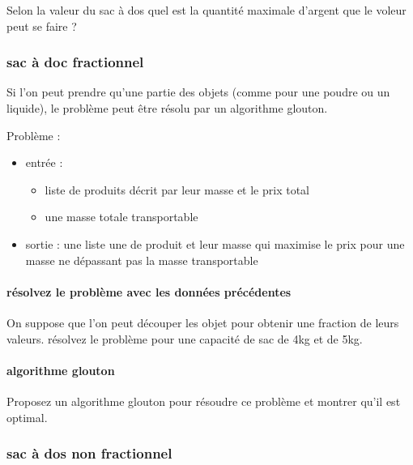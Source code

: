\documentclass[
]{article}
\providecommand{\tightlist}{%
  \setlength{\itemsep}{0pt}\setlength{\parskip}{0pt}}
\begin{document}
Selon la valeur du sac à dos quel est la quantité maximale d'argent que
le voleur peut se faire ?

\hypertarget{sac-uxe0-doc-fractionnel}{%
\subsubsection{sac à doc fractionnel}\label{sac-uxe0-doc-fractionnel}}

Si l'on peut prendre qu'une partie des objets (comme pour une poudre ou
un liquide), le problème peut être résolu par un algorithme glouton.

Problème :

\begin{itemize}
\tightlist
\item
  entrée :

  \begin{itemize}
  \tightlist
  \item
    liste de produits décrit par leur masse et le prix total
  \item
    une masse totale transportable
  \end{itemize}
\item
  sortie : une liste une de produit et leur masse qui maximise le prix
  pour une masse ne dépassant pas la masse transportable
\end{itemize}

\hypertarget{ruxe9solvez-le-probluxe8me-avec-les-donnuxe9es-pruxe9cuxe9dentes}{%
\paragraph{résolvez le problème avec les données
précédentes}\label{ruxe9solvez-le-probluxe8me-avec-les-donnuxe9es-pruxe9cuxe9dentes}}

On suppose que l'on peut découper les objet pour obtenir une fraction de
leurs valeurs. résolvez le problème pour une capacité de sac de 4kg et
de 5kg.

\hypertarget{algorithme-glouton}{%
\paragraph{algorithme glouton}\label{algorithme-glouton}}

Proposez un algorithme glouton pour résoudre ce problème et montrer
qu'il est optimal.

\hypertarget{sac-uxe0-dos-non-fractionnel}{%
\subsubsection{sac à dos non
fractionnel}\label{sac-uxe0-dos-non-fractionnel}}
\end{document}

